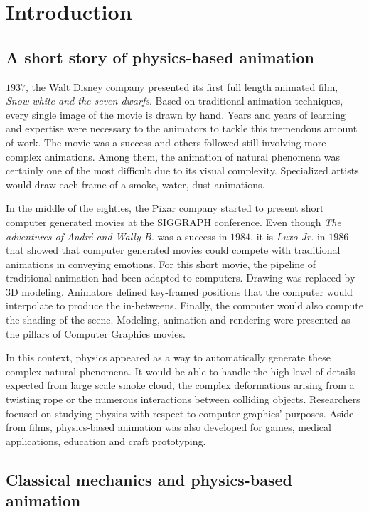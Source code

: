 \chapter{Introduction}
\label{chap:introduction}

\section{A short story of physics-based animation}

 $1937$, the Walt Disney company presented its first full length animated film, \emph{Snow white and the seven dwarfs}. Based on traditional animation techniques, every single image of the movie is drawn by hand. Years and years of learning and expertise were necessary to the animators to tackle this tremendous amount of work. The movie was a success and others followed still involving more complex animations. Among them, the animation of natural phenomena was certainly one of the most difficult due to its visual complexity. Specialized artists would draw each frame of a smoke, water, dust animations.

In the middle of the eighties, the Pixar company started to present short computer generated movies at the SIGGRAPH conference. Even though \emph{The adventures of André and Wally B.} was a success in $1984$, it is \emph{Luxo Jr.} in $1986$ that showed that computer generated movies could compete with traditional animations in conveying emotions. For this short movie, the pipeline of traditional animation had been adapted to computers. Drawing was replaced by 3D modeling. Animators defined key-framed positions that the computer would interpolate to produce the in-betweens. Finally, the computer would also compute the shading of the scene. Modeling, animation and rendering were presented as the pillars of Computer Graphics movies.

In this context, physics appeared as a way to automatically generate these complex natural phenomena. It would be able to handle the high level of details expected from large scale smoke cloud, the complex deformations arising from a twisting rope or the numerous interactions between colliding objects. Researchers focused on studying physics with respect to computer graphics' purposes. Aside from films, physics-based animation was also developed for games, medical applications, education and craft prototyping.

\section{Classical mechanics and physics-based animation}

